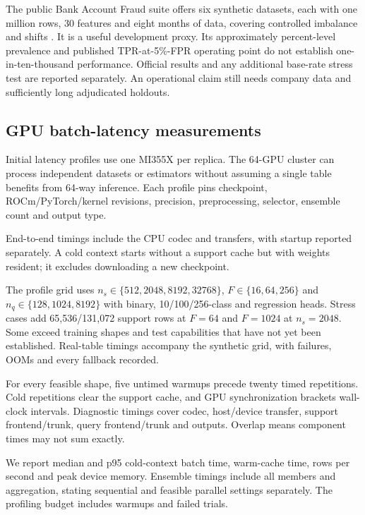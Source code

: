 \documentclass[11pt]{article}
\begin{document}
The public Bank Account Fraud suite offers six synthetic datasets, each with one million rows, 30 features and eight months of data, covering controlled imbalance and shifts \cite{baf}. It is a useful development proxy. Its approximately percent-level prevalence and published TPR-at-5\%-FPR operating point do not establish one-in-ten-thousand performance. Official results and any additional base-rate stress test are reported separately. An operational claim still needs company data and sufficiently long adjudicated holdouts.

\subsection{GPU batch-latency measurements}
\label{sec:latency-evaluation}

Initial latency profiles use one MI355X per replica. The 64-GPU cluster can process independent datasets or estimators without assuming a single table benefits from 64-way inference. Each profile pins checkpoint, ROCm/PyTorch/kernel revisions, precision, preprocessing, selector, ensemble count and output type.

End-to-end timings include the CPU codec and transfers, with startup reported separately. A cold context starts without a support cache but with weights resident; it excludes downloading a new checkpoint.

The profile grid uses $n_s\in\{512,2048,8192,32768\}$, $F\in\{16,64,256\}$ and $n_q\in\{128,1024,8192\}$ with binary, 10/100/256-class and regression heads. Stress cases add 65,536/131,072 support rows at $F=64$ and $F=1024$ at $n_s=2048$. Some exceed training shapes and test capabilities that have not yet been established. Real-table timings accompany the synthetic grid, with failures, OOMs and every fallback recorded.

For every feasible shape, five untimed warmups precede twenty timed repetitions. Cold repetitions clear the support cache, and GPU synchronization brackets wall-clock intervals. Diagnostic timings cover codec, host/device transfer, support frontend/trunk, query frontend/trunk and outputs. Overlap means component times may not sum exactly.

We report median and p95 cold-context batch time, warm-cache time, rows per second and peak device memory. Ensemble timings include all members and aggregation, stating sequential and feasible parallel settings separately. The profiling budget includes warmups and failed trials.
\end{document}
